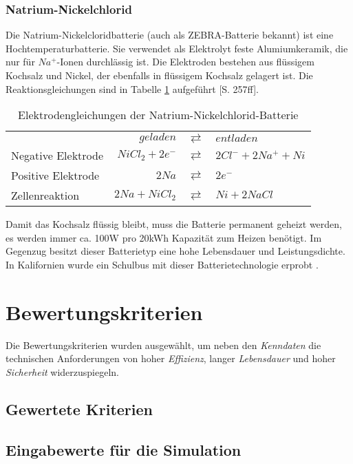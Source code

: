 \subsubsection{Natrium-Nickelchlorid}
Die Natrium-Nickelcloridbatterie (auch als ZEBRA-Batterie bekannt) ist eine Hochtemperaturbatterie. Sie verwendet als Elektrolyt feste Alumiumkeramik, die nur für $Na^+$-Ionen durchlässig ist. Die Elektroden bestehen aus flüssigem Kochsalz und Nickel, der ebenfalls in flüssigem Kochsalz gelagert ist. Die Reaktionsgleichungen sind in Tabelle \ref{ZEBRA} aufgeführt \cite{KiehneBattery}[S. 257ff].

\begin{table}\centering
	\begin{tabularx}{\linewidth}{XrcX}
		&       $geladen$ & $\rightleftarrows$ & $entladen$           \\
		Negative Elektrode & $NiCl_2 + 2e^-$ & $\rightleftarrows$ & $2Cl^- + 2Na^+ + Ni$ \\
		Positive Elektrode &           $2Na$ & $\rightleftarrows$ & $2e^-$               \\ \midrule
		Zellenreaktion     &  $2Na + NiCl_2$ & $\rightleftarrows$ & $Ni + 2NaCl$
	\end{tabularx}
	\caption{Elektrodengleichungen der Natrium-Nickelchlorid-Batterie}
	\label{ZEBRA}
\end{table}

Damit das Kochsalz flüssig bleibt, muss die Batterie permanent geheizt werden, es werden immer ca. 100W pro 20kWh Kapazität zum Heizen benötigt. Im Gegenzug besitzt dieser Batterietyp eine hohe Lebensdauer und Leistungsdichte. In Kalifornien wurde ein Schulbus mit dieser Batterietechnologie erprobt \cite{Electric-Transportation-Department:2004}.

\section{Bewertungskriterien}
Die Bewertungskriterien wurden ausgewählt, um neben den \emph{Kenndaten} die technischen Anforderungen von hoher \emph{Effizienz}, langer \emph{Lebensdauer} und hoher \emph{Sicherheit} widerzuspiegeln.

\subsection{Gewertete Kriterien}

\subsection{Eingabewerte für die Simulation}

